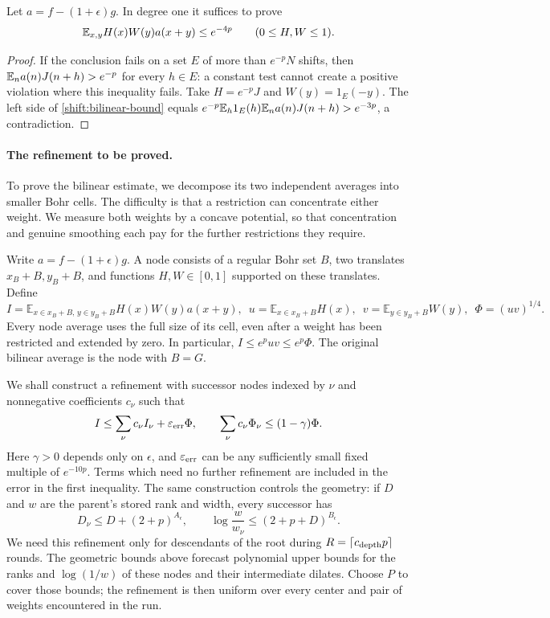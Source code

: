 \begin{lemma}\label{shift:bilinear}
Let $a=f-(1+\epsilon)g$.  In degree one it suffices to prove
\begin{equation}\label{shift:bilinear-bound}
 \mathbb E_{x,y}H(x)W(y)a(x+y)\leq e^{-4p}
 \qquad(0\leq H,W\leq1).
\end{equation}
\end{lemma}
\begin{proof}
If the conclusion fails on a set $E$ of more than $e^{-p}N$ shifts,
then $\mathbb E_n a(n)J(n+h)>e^{-p}$ for every $h\in E$: a constant test
cannot create a positive violation where this inequality fails.
Take $H= e^{-p}J$ and $W(y)=1_E(-y)$.  The left side of
\eqref{shift:bilinear-bound} equals
$e^{-p}\mathbb E_h1_E(h)\mathbb E_n a(n)J(n+h)>e^{-3p}$, a contradiction.
\end{proof}

\paragraph{The refinement to be proved.}
To prove the bilinear estimate, we decompose its two independent
averages into smaller Bohr cells. The difficulty is that a restriction
can concentrate either weight. We measure both weights by a concave
potential, so that concentration and genuine smoothing each pay for
the further restrictions they require.

Write $a=f-(1+\epsilon)g$. A node consists of a regular Bohr set
$B$, two translates $x_B+B,y_B+B$, and functions $H,W\in[0,1]$
supported on these translates. Define
\[
 I=\mathbb E_{x\in x_B+B,\,y\in y_B+B}H(x)W(y)a(x+y),
 \enspace u=\mathbb E_{x\in x_B+B}H(x),
 \enspace v=\mathbb E_{y\in y_B+B}W(y),
 \enspace \Phi=(uv)^{1/4}.
\]
Every node average uses the full size of its cell, even after a weight
has been restricted and extended by zero. In particular,
$I\le e^puv\le e^p\Phi$. The original bilinear average is the node
with $B=G$.

We shall construct a refinement with successor nodes indexed by
$\nu$ and nonnegative coefficients $c_\nu$ such that
\begin{equation}\label{shift:one-round-refinement}
 I\le\sum_\nu c_\nu I_\nu+\varepsilon_{\rm err}\Phi,
 \qquad
 \sum_\nu c_\nu\Phi_\nu\le(1-\gamma)\Phi.
\end{equation}
Here $\gamma>0$ depends only on $\epsilon$, and
$\varepsilon_{\rm err}$ can be any sufficiently small fixed multiple
of $e^{-10p}$. Terms which need no further refinement are included
in the error in the first inequality. The same construction controls
the geometry: if $D$ and $w$ are the parent's stored rank and width,
every successor has
\begin{equation}\label{shift:one-round-geometry}
 D_\nu\le D+(2+p)^{A_\epsilon},\qquad
 \log\frac{w}{w_\nu}\le(2+p+D)^{B_\epsilon}.
\end{equation}
We need this refinement only for descendants of the root during
$R=\lceil c_{\rm depth}p\rceil$ rounds. The geometric bounds above
forecast polynomial upper bounds for the ranks and $\log(1/w)$ of
these nodes and their intermediate dilates. Choose $P$ to cover those
bounds; the refinement is then uniform over every center and pair of
weights encountered in the run.

